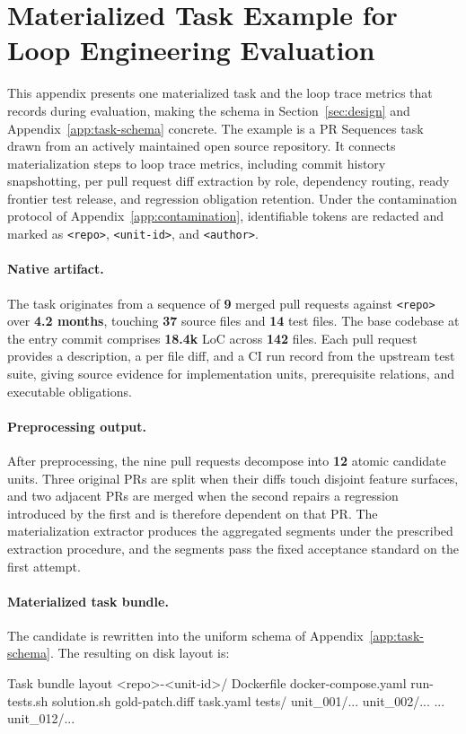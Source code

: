 \section{Materialized Task Example for Loop Engineering Evaluation}\label{app:example-task}

This appendix presents one materialized task and the loop trace metrics that \lhb{} records during evaluation, making the schema in Section~\ref{sec:design} and Appendix~\ref{app:task-schema} concrete. The example is a PR Sequences task drawn from an actively maintained open source repository. It connects materialization steps to loop trace metrics, including commit history snapshotting, per pull request diff extraction by role, dependency routing, ready frontier test release, and regression obligation retention. Under the contamination protocol of Appendix~\ref{app:contamination}, identifiable tokens are redacted and marked as \texttt{<repo>}, \texttt{<unit-id>}, and \texttt{<author>}.

\paragraph{Native artifact.}

The task originates from a sequence of \textbf{9} merged pull requests against \texttt{<repo>} over \textbf{4.2 months}, touching \textbf{37} source files and \textbf{14} test files. The base codebase at the entry commit comprises \textbf{18.4k} LoC across \textbf{142} files. Each pull request provides a description, a per file diff, and a CI run record from the upstream test suite, giving source evidence for implementation units, prerequisite relations, and executable obligations.

\paragraph{Preprocessing output.}

After preprocessing, the nine pull requests decompose into \textbf{12} atomic candidate units. Three original PRs are split when their diffs touch disjoint feature surfaces, and two adjacent PRs are merged when the second repairs a regression introduced by the first and is therefore dependent on that PR. The materialization extractor produces the aggregated segments under the prescribed extraction procedure, and the segments pass the fixed acceptance standard on the first attempt.

\paragraph{Materialized task bundle.}
The candidate is rewritten into the uniform schema of Appendix~\ref{app:task-schema}. The resulting on disk layout is:
\begin{promptbox}{Task bundle layout}
<repo>-<unit-id>/
  Dockerfile
  docker-compose.yaml
  run-tests.sh
  solution.sh
  gold-patch.diff
  task.yaml
  tests/
    unit_001/...
    unit_002/...
    ...
    unit_012/...
\end{promptbox}

